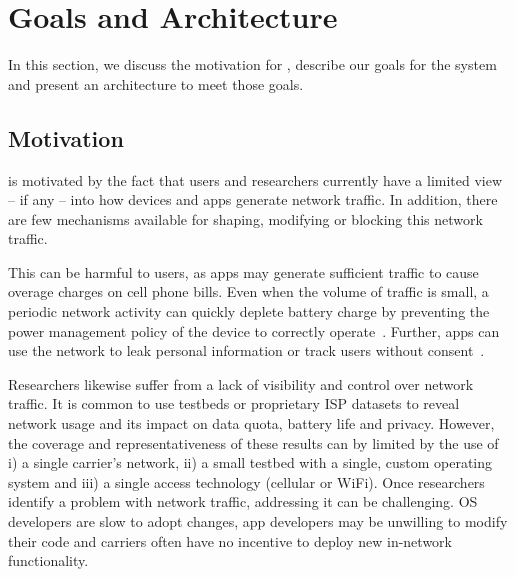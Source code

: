 \section{Goals and Architecture}
\label{sec:goals}
In this section, we discuss the motivation for \meddle, describe our goals for the 
system and present an architecture to meet those goals.

\subsection{Motivation}
\meddle is motivated by the fact that users and researchers currently 
have a limited view -- if any -- into how devices and apps generate network 
traffic. In addition, there are few mechanisms available for shaping, modifying 
or blocking this network traffic. 

This can be harmful to users, as apps may generate sufficient traffic
to cause overage charges on cell phone bills. Even when the volume of
traffic is small, a periodic network activity can quickly deplete
battery charge by preventing the power management policy of the device to
correctly operate~\cite{qian:periodic}. Further, apps can use the network to leak personal
information or track users without consent~\cite{hornyack:appfence}.

Researchers  likewise suffer from a lack of visibility and control over 
network traffic. It is common 
to use testbeds or proprietary ISP datasets to reveal network usage 
and its impact on data quota, battery life and privacy. However, the 
coverage and representativeness of these results can by limited by 
the use of i) a single carrier's network, ii) a small testbed with 
a single, custom operating system and iii) a single access technology 
(cellular or WiFi). Once researchers identify a problem with network traffic, 
addressing it can be challenging. OS developers are slow to 
adopt changes, app developers may be unwilling to modify their code 
and carriers often have no incentive to deploy new in-network 
functionality. 

